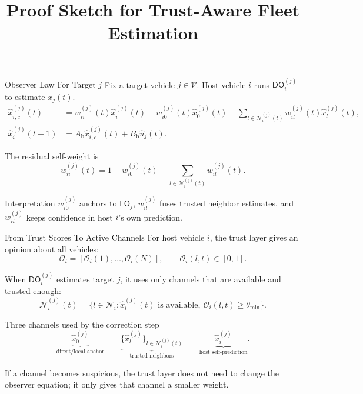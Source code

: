 \documentclass[aspectratio=169,10pt]{beamer}
\title[Trust Fleet Estimation]{Proof Sketch for Trust-Aware Fleet Estimation}
\author{}
\date{}
\newcommand{\V}{\mathcal{V}}
\newcommand{\LO}{\mathsf{LO}}
\newcommand{\DO}{\mathsf{DO}}
\providecommand{\O}{}
\renewcommand{\O}{\mathcal{O}}
\begin{document}
\begin{frame}
  \titlepage
\end{frame}

\begin{frame}{Observer Law For Target $j$}
\small
Fix a target vehicle $j\in\V$. Host vehicle $i$ runs $\DO_i^{(j)}$ to estimate $x_j(t)$.
\vspace{0.5ex}
\begin{align*}
\hat{x}_{i,c}^{(j)}(t)
&=w_{ii}^{(j)}(t)\hat{x}_{i}^{(j)}(t)
+w_{i0}^{(j)}(t)\hat{x}_{0}^{(j)}(t)
+\sum_{l\in \mathcal{N}_{i}^{(j)}(t)}
w_{il}^{(j)}(t)\hat{x}_{l}^{(j)}(t),\\
\hat{x}_{i}^{(j)}(t+1)
&=A_{\text{b}}\hat{x}_{i,c}^{(j)}(t)+B_{\text{b}}\hat{u}_{j}(t).
\end{align*}

The residual self-weight is
\[
w_{ii}^{(j)}(t)=
1-w_{i0}^{(j)}(t)
-\sum_{l\in\mathcal{N}_{i}^{(j)}(t)}w_{il}^{(j)}(t).
\]

\begin{block}{Interpretation}
$w_{i0}^{(j)}$ anchors to $\LO_j$, $w_{il}^{(j)}$ fuses trusted neighbor estimates, and $w_{ii}^{(j)}$ keeps confidence in host $i$'s own prediction.
\end{block}
\end{frame}

\begin{frame}{From Trust Scores To Active Channels}
\small
For host vehicle $i$, the trust layer gives an opinion about all vehicles:
\[
\O_i=[\O_i(1),\ldots,\O_i(N)],\qquad \O_i(l,t)\in[0,1].
\]

When $\DO_i^{(j)}$ estimates target $j$, it uses only channels that are available
and trusted enough:
\[
\mathcal{N}_{i}^{(j)}(t)
=\Big\{l\in\mathcal{N}_i:
\hat{x}_{l}^{(j)}(t)\text{ is available},\
\O_i(l,t)\ge\theta_{\min}\Big\}.
\]

\begin{block}{Three channels used by the correction step}
\[
\underbrace{\hat{x}_{0}^{(j)}}_{\text{direct/local anchor}}
\qquad
\underbrace{\{\hat{x}_{l}^{(j)}\}_{l\in\mathcal{N}_{i}^{(j)}(t)}}_{\text{trusted neighbors}}
\qquad
\underbrace{\hat{x}_{i}^{(j)}}_{\text{host self-prediction}}.
\]
\end{block}

If a channel becomes suspicious, the trust layer does not need to change the
observer equation; it only gives that channel a smaller weight.
\end{frame}
\end{document}
